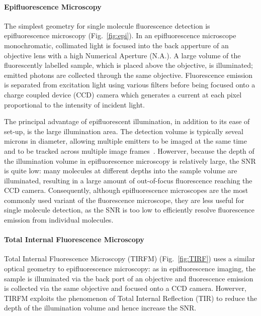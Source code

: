 \paragraph{Epifluorescence Microscopy}
The simplest geometry for single molecule fluorescence detection is epifluorescence microscopy (Fig.~\ref{fig:epi}). In an epifluorescence microscope monochromatic, collimated light is focused into the back apperture of an objective lens with a high Numerical Aperture (N.A.). A large volume of the fluorescently labelled sample, which is placed above the objective, is illuminated; emitted photons are collected through the same objective. Fluorescence emission is separated from excitation light using various filters before being focused onto a charge coupled device (CCD) camera which generates a current at each pixel proportional to the intensity of incident light.

The principal advantage of epifluorescent illumination, in addition to its ease of set-up, is the large illumination area. The detection volume is typically seveal microns in diameter, allowing multiple emitters to be imaged at the same time and to be tracked across multiple image frames~\cite{???}. Howerver, because the depth of the illumination volume in epifluorescence microscopy is relatively large, the SNR is quite low: many molecules at different depths into the sample volume are illuminated, resulting in a large amount of out-of-focus fluorescence reaching the CCD camera. Consequently, although epifluorescence microscopes are the most commonly used variant of the fluorescence microscope, they are less useful for single molecule detection, as the SNR is too low to efficiently resolve fluorescence emission from individual molecules.

\paragraph{Total Internal Fluorescence Microscopy}
Total Internal Fluorescence Microscopy (TIRFM) (Fig.~\ref{fig:TIRF}) uses a similar optical geometry to epifluorescence microscopy: as in epifluorescence imaging, the sample is illuminated via the back port of an objective and fluorescence emission is collected via the same objective and focused onto a CCD camera. Howerver, TIRFM exploits the phenomenon of Total Internal Reflection (TIR) to reduce the depth of the illumination volume and hence increase the SNR.

